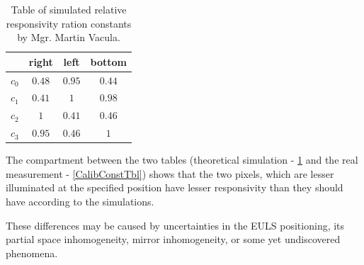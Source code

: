 \begin{table}[H]
\centering
\begin{tabular}{|c|c|c|c|}
\hline
   & right & left & bottom \\ \hline
$c_0$ & $0.48$    & $0.95$   & $0.44$     \\ \hline
$c_1$ & $0.41$    & $1$   	 & $0.98$      \\ \hline
$c_2$ & $1$    	  & $0.41$   & $0.46$      \\ \hline
$c_3$ & $0.95$    & $0.46$   & $1$      \\ \hline
\end{tabular}
\caption{Table of simulated relative responsivity ration constants by Mgr. Martin Vacula.}
 \label{CalibConstTblSim}
\end{table}

The compartment between the two tables (theoretical simulation - \ref{CalibConstTblSim} and the real measurement - \ref{CalibConstTbl}) shows that the two pixels, which are lesser illuminated at the specified position have lesser responsivity than they should have according to the simulations.

\par
These differences may be caused by uncertainties in the EULS positioning, its partial space inhomogeneity, mirror inhomogeneity, or some yet undiscovered phenomena.





